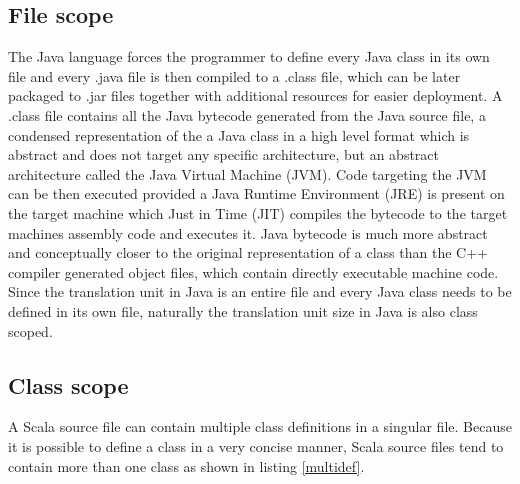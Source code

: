 \documentclass{VUMIFPSbakalaurinis}
\begin{document}

\subsection{File scope}
The Java language forces the programmer to define every Java class in its own file and every .java file is then compiled to a .class file, which can be later packaged to .jar files together with additional resources for easier deployment.
A .class file contains all the Java bytecode generated from the Java source file, a condensed representation of the a Java class in a high level format which is abstract and does not target any specific architecture, but an abstract architecture called the Java Virtual Machine (JVM).
Code targeting the JVM can be then executed provided a Java Runtime Environment (JRE) is present on the target machine which Just in Time (JIT) compiles the bytecode to the target machines assembly code and executes it.
Java bytecode is much more abstract and conceptually closer to the original representation of a class than the C++ compiler generated object files, which contain directly executable machine code.
Since the translation unit in Java is an entire file and every Java class needs to be defined in its own file, naturally the translation unit size in Java is also class scoped.

\subsection{Class scope}

A Scala source file can contain multiple class definitions in a singular file.
Because it is possible to define a class in a very concise manner, Scala source files tend to contain more than one class as shown in listing \ref{multidef}.

\end{document}
